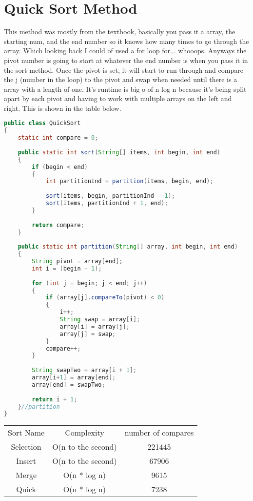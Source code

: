 \documentclass[letterpaper, 10pt]{article}
\begin{document}
\section{Quick Sort Method}
This method was mostly from the textbook, basically you pass it a array, the starting num, and the end number so it knows how many times to go through the array. Which looking back I could of used a for loop for... whooops. Anyways the pivot number is going to start at whatever the end number is when you pass it in the sort method. Once the pivot is set, it will start to run through and compare the j (number in the loop) to the pivot and swap when needed until there is a array with a length of one. It's runtime is big o of n log n because it's being split apart by each pivot and having to work with multiple arrays on the left and right. This is shown in the table below.
\begin{lstlisting}[language = java]
public class QuickSort 
{
	static int compare = 0;
	
	public static int sort(String[] items, int begin, int end)
	{
		if (begin < end)
		{
			int partitionInd = partition(items, begin, end);
			
			sort(items, begin, partitionInd - 1);
			sort(items, partitionInd + 1, end);
		}
		
		return compare;
	}
	
	public static int partition(String[] array, int begin, int end)
	{
		String pivot = array[end];
		int i = (begin - 1);
		
		for (int j = begin; j < end; j++)
		{
			if (array[j].compareTo(pivot) < 0)
			{
				i++;
				String swap = array[i];
				array[i] = array[j];
				array[j] = swap;
			}
			compare++;
		}
		
		String swapTwo = array[i + 1];
		array[i+1] = array[end];
		array[end] = swapTwo;
		
		return i + 1;
	}//partition
}

\end{lstlisting}

\begin{center}
\begin{tabular}{ |c|c|c| } 
 \hline
 Sort Name & Complexity & number of compares \\ 
 Selection & O(n to the second) & 221445 \\ 
 Insert & O(n to the second) & 67906  \\ 
 Merge & O(n * log n) & 9615 \\ 
 Quick & O(n * log n) & 7238 \\ 
 \hline
\end{tabular}
\end{center}
\end{document}
